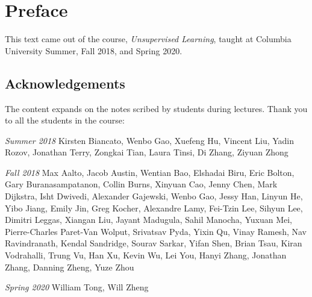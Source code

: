 \chapter*{Preface}

This text came out of the course, \textit{Unsupervised Learning},
taught at Columbia University Summer, Fall 2018, and Spring 2020. 

\section*{Acknowledgements} The content expands on the notes scribed
by students during lectures. Thank you to all the students in the
course: 

\textit{Summer 2018} Kirsten Biancato, Wenbo Gao, Xuefeng Hu,
Vincent Liu, Yadin Rozov, Jonathan Terry, Zongkai Tian, Laura Tinsi,
Di Zhang, Ziyuan Zhong

\textit{Fall 2018} Max Aalto, Jacob Austin, Wentian Bao, Elshadai
Biru, Eric Bolton, Gary Buranasampatanon, Collin Burns, Xinyuan Cao,
Jenny Chen, Mark Dijkstra, Isht Dwivedi, Alexander Gajewski, Wenbo
Gao, Jessy Han, Linyun He, Yibo Jiang, Emily Jin, Greg Kocher,
Alexandre Lamy, Fei-Tzin Lee, Sihyun Lee, Dimitri Leggas, Xiangan Liu,
Jayant Madugula, Sahil Manocha, Yuxuan Mei, Pierre-Charles Paret-Van
Wolput, Srivatsav Pyda, Yixin Qu, Vinay Ramesh, Nav Ravindranath,
Kendal Sandridge, Sourav Sarkar, Yifan Shen, Brian Tsau, Kiran
Vodrahalli, Trung Vu, Han Xu, Kevin Wu, Lei You, Hanyi Zhang, Jonathan
Zhang, Danning Zheng, Yuze Zhou

\textit{Spring 2020} William Tong, Will Zheng

